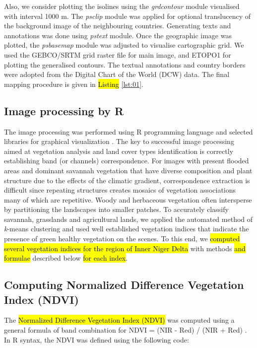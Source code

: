 \documentclass[12pt,a4paper,oneside]{article}
\def \newpar{\vspace{6pt}}
\begin{document}
\newpar Also, we consider plotting the isolines using the \emph{grdcontour} module visualised with interval 1000 m. The \emph{psclip} module was applied for optional translucency of the background image of the neighbouring countries. Generating texts and annotations was done using \emph{pstext} module. Once the geographic image was plotted, the \emph{psbasemap} module was adjusted to visualise cartographic grid. We used the GEBCO/SRTM grid raster file for main image, and ETOPO1 for plotting the generalised contours. The textual annotations and country borders were adopted from the Digital Chart of the World (DCW) data. The final mapping procedure is given in \hl{Listing} \ref{lst:01}.

\subsection*{Image processing by R}

\newpar The image processing was performed using R programming language \citep{RCoreTeam} and selected libraries for graphical visualization \citep{Murrell}. The key to successful image processing aimed at vegetation analysis and land cover types identification is correctly establishing band (or channels) correspondence. For images with present flooded areas and dominant savannah vegetation that have diverse composition and plant structure due to the effects of the climatic gradient, correspondence extraction is difficult since repeating structures creates mosaics of vegetation associations many of which are repetitive. Woody and herbaceous vegetation often intersperse by partitioning the landscapes into smaller patches. To accurately classify savannah, grasslands and agricultural lands, we applied the automated method of \emph{k}-means clustering and used well established vegetation indices that indicate the presence of green healthy vegetation on the scenes. To this end, we \hl{computed several vegetation indices for the region of Inner Niger Delta} with methods \hl{and formulae }described below \hl{for each index}. 

\subsection*{Computing Normalized Difference Vegetation Index (NDVI)}

\newpar The \hl{Normalized Difference Vegetation Index (NDVI)} was computed using a general formula of band combination for NDVI = (NIR - Red) / (NIR + Red) \citep{Tarpley}. In R syntax, the NDVI was defined using the following code:
\end{document}
